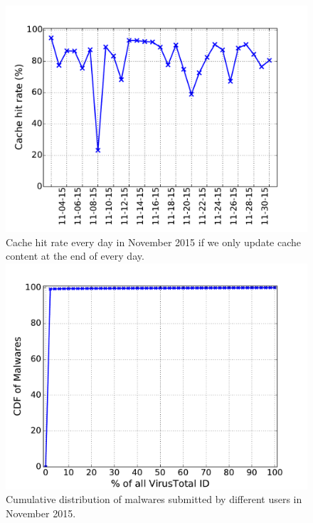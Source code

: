 \begin{figure}[!htb]
  \includegraphics[width=\linewidth]{figure/LRU_day}
{
Cache hit rate every day in November 2015 if we only update cache content at the end of every day.
}
\endminipage\hfill
{}
  \includegraphics[width=\linewidth]{figure/id}
{Cumulative distribution of malwares submitted by different users in November 2015.}
\endminipage\hfill
{}%

\end{figure}

